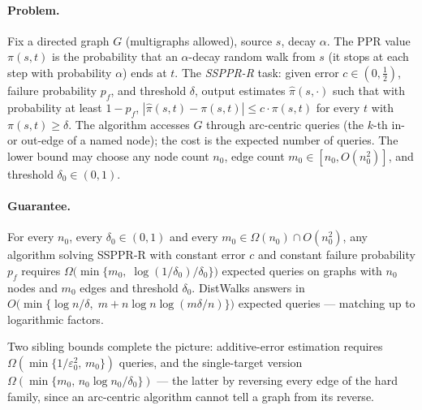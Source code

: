 \paragraph{Problem.}
Fix a directed graph $G$ (multigraphs allowed), source $s$, decay $\alpha$. The PPR value
$\pi(s,t)$ is the probability that an $\alpha$-decay random walk from $s$ (it stops at each
step with probability $\alpha$) ends at $t$. The \emph{SSPPR-R} task: given error
$c \in (0,\tfrac12)$, failure probability $p_f$, and threshold $\delta$, output estimates
$\hat{\pi}(s,\cdot)$ such that with probability at least $1-p_f$,
$|\hat{\pi}(s,t) - \pi(s,t)| \le c\cdot\pi(s,t)$ for every $t$ with $\pi(s,t) \ge \delta$.
The algorithm accesses $G$ through arc-centric queries (the $k$-th in- or out-edge of a named
node); the cost is the expected number of queries. The lower bound may choose any node count
$n_0$, edge count $m_0 \in [n_0, O(n_0^2)]$, and threshold $\delta_0 \in (0,1)$.


\paragraph{Guarantee.}

\begin{theorem}\label{thm:adv-pprlb}
For every $n_0$, every $\delta_0 \in (0,1)$ and every $m_0 \in \Omega(n_0) \cap O(n_0^2)$, any
algorithm solving SSPPR-R with constant error $c$ and constant failure probability $p_f$
requires $\Omega\bigl(\min\{m_0,\; \log(1/\delta_0)/\delta_0\}\bigr)$ expected queries on
graphs with $n_0$ nodes and $m_0$ edges and threshold $\delta_0$. DistWalks answers in
$O\bigl(\min\{\log n/\delta,\; m + n\log n\log(m\delta/n)\}\bigr)$ expected queries ---
matching up to logarithmic factors. \eop
\end{theorem}

Two sibling bounds complete the picture: additive-error estimation requires
$\Omega(\min\{1/\varepsilon_0^2,\, m_0\})$ queries, and the single-target version
$\Omega(\min\{m_0,\, n_0\log n_0/\delta_0\})$ --- the latter by reversing every edge of the
hard family, since an arc-centric algorithm cannot tell a graph from its reverse.

